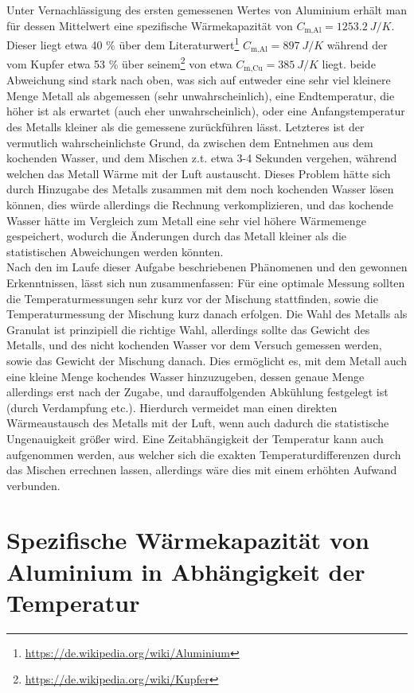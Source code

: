 \documentclass{include/protokollclass}
\begin{document}
Unter Vernachlässigung des ersten gemessenen Wertes von Aluminium erhält man für dessen Mittelwert eine spezifische Wärmekapazität von $C_\text{m,Al} = \SI{1253.2}{J/K}$. Dieser liegt etwa 40 \% über dem Literaturwert\footnote{\url{https://de.wikipedia.org/wiki/Aluminium}} $C_\text{m,Al} = \SI{897}{J/K}$ während der vom Kupfer etwa 53 \% über seinem\footnote{\url{https://de.wikipedia.org/wiki/Kupfer}} von etwa $C_\text{m,Cu} = \SI{385}{J/K}$ liegt. beide Abweichung sind stark nach oben, was sich auf entweder eine sehr viel kleinere Menge Metall als abgemessen (sehr unwahrscheinlich), eine Endtemperatur, die höher ist als erwartet (auch eher unwahrscheinlich), oder eine Anfangstemperatur des Metalls kleiner als die gemessene zurückführen lässt. Letzteres ist der vermutlich wahrscheinlichste Grund, da zwischen dem Entnehmen aus dem kochenden Wasser, und dem Mischen z.t. etwa 3-4 Sekunden vergehen, während welchen das Metall Wärme mit der Luft austauscht. Dieses Problem hätte sich durch Hinzugabe des Metalls zusammen mit dem noch kochenden Wasser lösen können, dies würde allerdings die Rechnung verkomplizieren, und das kochende Wasser hätte im Vergleich zum Metall eine sehr viel höhere Wärmemenge gespeichert, wodurch die Änderungen durch das Metall kleiner als die statistischen Abweichungen werden könnten.\\
Nach den im Laufe dieser Aufgabe beschriebenen Phänomenen und den gewonnen Erkenntnissen, lässt sich nun zusammenfassen: Für eine optimale Messung sollten die Temperaturmessungen sehr kurz vor der Mischung stattfinden, sowie die Temperaturmessung der Mischung kurz danach erfolgen. Die Wahl des Metalls als Granulat ist prinzipiell die richtige Wahl, allerdings sollte das Gewicht des Metalls, und des nicht kochenden Wasser vor dem Versuch gemessen werden, sowie das Gewicht der Mischung danach. Dies ermöglicht es, mit dem Metall auch eine kleine Menge kochendes Wasser hinzuzugeben, dessen genaue Menge allerdings erst nach der Zugabe, und darauffolgenden Abkühlung festgelegt ist (durch Verdampfung etc.). Hierdurch vermeidet man einen direkten Wärmeaustausch des Metalls mit der Luft, wenn auch dadurch die statistische Ungenauigkeit größer wird. Eine Zeitabhängigkeit der Temperatur kann auch aufgenommen werden, aus welcher sich die exakten Temperaturdifferenzen durch das Mischen errechnen lassen, allerdings wäre dies mit einem erhöhten Aufwand verbunden.

\chapter{Spezifische Wärmekapazität von Aluminium in Abhängigkeit der Temperatur}
\end{document}
